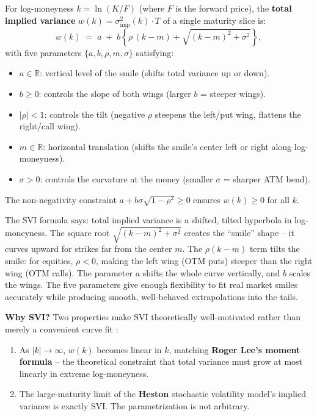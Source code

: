 \begin{definition}
\label{def:svi}
For log-moneyness $k = \ln(K/F)$ (where $F$ is the forward price), the \textbf{total implied variance} $w(k) = \sigma_{\text{imp}}^2(k) \cdot T$ of a single maturity slice is:
\begin{equation}\label{eq:svi-raw}
w(k) \;=\; a \;+\; b\!\left\{\rho\,(k - m) + \sqrt{(k-m)^2 + \sigma^2}\right\},
\end{equation}
with five parameters $\{a, b, \rho, m, \sigma\}$ satisfying:
\begin{itemize}[nosep]
  \item $a \in \mathbb{R}$: vertical level of the smile (shifts total variance up or down).
  \item $b \geq 0$: controls the slope of both wings (larger $b$ = steeper wings).
  \item $|\rho| < 1$: controls the tilt (negative $\rho$ steepens the left/put wing, flattens the right/call wing).
  \item $m \in \mathbb{R}$: horizontal translation (shifts the smile's center left or right along log-moneyness).
  \item $\sigma > 0$: controls the curvature at the money (smaller $\sigma$ = sharper ATM bend).
\end{itemize}
The non-negativity constraint $a + b\sigma\sqrt{1 - \rho^2} \geq 0$ ensures $w(k) \geq 0$ for all $k$.
\end{definition}

\begin{intuition}
The SVI formula says: total implied variance is a shifted, tilted hyperbola in log-moneyness.
The square root $\sqrt{(k-m)^2 + \sigma^2}$ creates the ``smile'' shape -- it curves upward for strikes far from the center $m$.
The $\rho(k-m)$ term tilts the smile: for equities, $\rho < 0$, making the left wing (OTM puts) steeper than the right wing (OTM calls).
The parameter $a$ shifts the whole curve vertically, and $b$ scales the wings.
The five parameters give enough flexibility to fit real market smiles accurately while producing smooth, well-behaved extrapolations into the tails.
\end{intuition}

\textbf{Why SVI?}
Two properties make SVI theoretically well-motivated rather than merely a convenient curve fit \citep{GatheralJacquier2014}:
\begin{enumerate}[nosep]
  \item As $|k| \to \infty$, $w(k)$ becomes linear in $k$, matching \textbf{Roger Lee's moment formula} -- the theoretical constraint that total variance must grow at most linearly in extreme log-moneyness.
  \item The large-maturity limit of the \textbf{Heston} stochastic volatility model's implied variance is exactly SVI. The parametrization is not arbitrary.
\end{enumerate}

